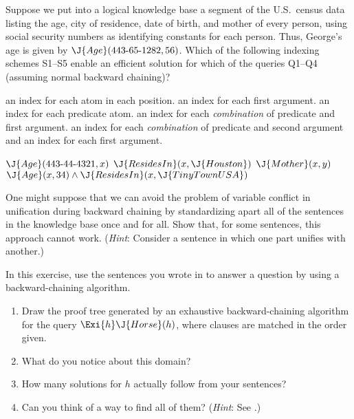 \begin{exercise}
Suppose we put into a logical knowledge base a segment of the U.S.\ census
data listing the age, city of residence, date of birth, and mother of
every person, using social security numbers as identifying constants
for each person. Thus, George's age is given by
\(\J{Age}(\mbox{{443}-{65}-{1282}}, {56})\). Which of the following indexing schemes S1--S5
enable an efficient solution for which of the queries Q1--Q4
(assuming normal backward chaining)?
\begin{description}
 an index for each atom in each position.
 an index for each first argument.
 an index for each predicate atom.
 an index for each {\it combination} of predicate and 
first argument.
 an index for each {\it combination} of predicate and second
argument and an index for each first argument.
\end{description}
\begin{description}
 \(\J{Age}(\mbox{{443}-{44}-{4321}},x)\)
 \(\J{ResidesIn}(x,\J{Houston})\)
 \(\J{Mother}(x,y)\)
 \(\J{Age}(x,{34}) \land \J{ResidesIn}(x,\J{TinyTownUSA})\)
\end{description}
\end{exercise} 

\begin{exercise}%
One might suppose that we can avoid the problem of variable conflict
in unification during backward chaining by
standardizing apart all of the sentences in
the knowledge base once and for all. Show that, for some sentences,
this approach cannot work. ({\em Hint}: Consider a sentence in which one part
unifies with another.)
\end{exercise} 

\begin{exercise}
In this exercise,  use the sentences you wrote
in  to answer a question by using a
backward-chaining algorithm.
\begin{enumerate}
\item
Draw the proof tree generated by an exhaustive backward-chaining
algorithm for the query \(\Exi{h}\J{Horse}(h)\), where clauses are matched
in the order given.
\item
What do you notice about this domain?
\item 
How many solutions for \(h\) actually follow from your sentences?
\item 
Can you think of a way to find all of them? ({\em Hint}: See
.)
\end{enumerate}
\end{exercise} 

